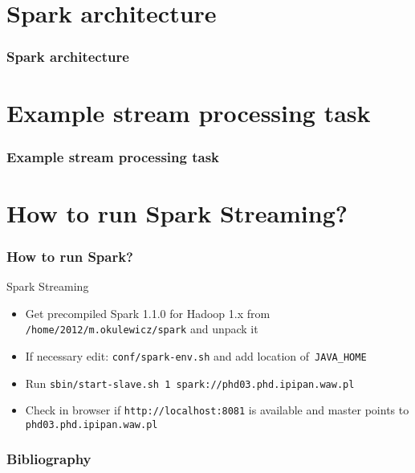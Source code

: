 \documentclass{beamer}
\begin{document}
\section{Spark architecture}
\begin{frame}
\frametitle{Spark architecture}
\end{frame}

\section{Example stream processing task}
\begin{frame}
\frametitle{Example stream processing task}
\end{frame}

\section{How to run Spark Streaming?}
\begin{frame}
\frametitle{How to run Spark?}
\begin{block}{Spark Streaming}
	\begin{itemize}
		\item Get precompiled Spark 1.1.0 for Hadoop 1.x from \texttt{/home/2012/m.okulewicz/spark} and unpack it
		\item If necessary edit: \texttt{conf/spark-env.sh} and add location of~\texttt{JAVA\_HOME}
		\item Run \texttt{sbin/start-slave.sh 1 spark://phd03.phd.ipipan.waw.pl}
		\item Check in browser if \texttt{http://localhost:8081} is available and master points to \texttt{phd03.phd.ipipan.waw.pl}
	\end{itemize}
	\end{block}
\end{frame}

\begin{frame}[allowframebreaks]
	\frametitle<presentation>{Bibliography}
	\nocite{*}
	
	\tiny
	
\end{frame}
\end{document}
